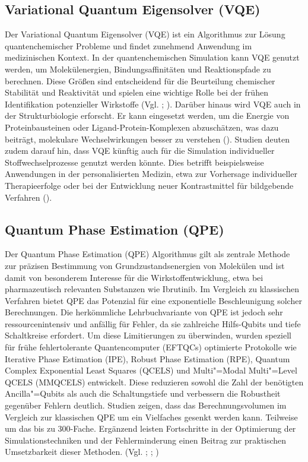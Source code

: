 \subsection{Variational Quantum Eigensolver (VQE)}
Der Variational Quantum Eigensolver (VQE) ist ein Algorithmus zur Lösung quantenchemischer Probleme und findet zunehmend Anwendung im medizinischen Kontext. In der quantenchemischen Simulation kann VQE genutzt werden, um Molekülenergien, Bindungsaffinitäten und Reaktionspfade zu berechnen. Diese Größen sind entscheidend für die Beurteilung chemischer Stabilität und Reaktivität und spielen eine wichtige Rolle bei der frühen Identifikation potenzieller Wirkstoffe (Vgl. \cite{palFuturePotentialQuantum2024}; \cite{cao_quantum_2019}). Darüber hinaus wird VQE auch in der Strukturbiologie erforscht. Er kann eingesetzt werden, um die Energie von Proteinbausteinen oder Ligand-Protein-Komplexen abzuschätzen, was dazu beiträgt, molekulare Wechselwirkungen besser zu verstehen (\cite{marchettiQuantumComputingAlgorithms2022}). Studien deuten zudem darauf hin, dass VQE künftig auch für die Simulation individueller Stoffwechselprozesse genutzt werden könnte. Dies betrifft beispielsweise Anwendungen in der personalisierten Medizin, etwa zur Vorhersage individueller Therapieerfolge oder bei der Entwicklung neuer Kontrastmittel für bildgebende Verfahren (\cite{palFuturePotentialQuantum2024}).

\subsection{Quantum Phase Estimation (QPE)}
Der Quantum Phase Estimation (QPE) Algorithmus gilt als zentrale Methode zur präzisen Bestimmung von Grundzustandsenergien von Molekülen und ist damit von besonderem Interesse für die Wirkstoffentwicklung, etwa bei pharmazeutisch relevanten Substanzen wie Ibrutinib. Im Vergleich zu klassischen Verfahren bietet QPE das Potenzial für eine exponentielle Beschleunigung solcher Berechnungen. Die herkömmliche Lehrbuchvariante von QPE ist jedoch sehr ressourcenintensiv und anfällig für Fehler, da sie zahlreiche Hilfs-Qubits und tiefe Schaltkreise erfordert. Um diese Limitierungen zu überwinden, wurden speziell für frühe fehlertolerante Quantencomputer (EFTQCs) optimierte Protokolle wie Iterative Phase Estimation (IPE), Robust Phase Estimation (RPE), Quantum Complex Exponential Least Squares (QCELS) und Multi"=Modal Multi"=Level QCELS (MMQCELS) entwickelt. Diese reduzieren sowohl die Zahl der benötigten Ancilla"=Qubits als auch die Schaltungstiefe und verbessern die Robustheit gegenüber Fehlern deutlich. Studien zeigen, dass das Berechnungsvolumen im Vergleich zur klassischen QPE um ein Vielfaches gesenkt werden kann. Teilweise um das bis zu 300-Fache. Ergänzend leisten Fortschritte in der Optimierung der Simulationstechniken und der Fehlerminderung einen Beitrag zur praktischen Umsetzbarkeit dieser Methoden. (Vgl. \cite{nelson_assessment_2024}; \cite{blunt_perspective_2022}; \cite{blunt_statistical_2023})

